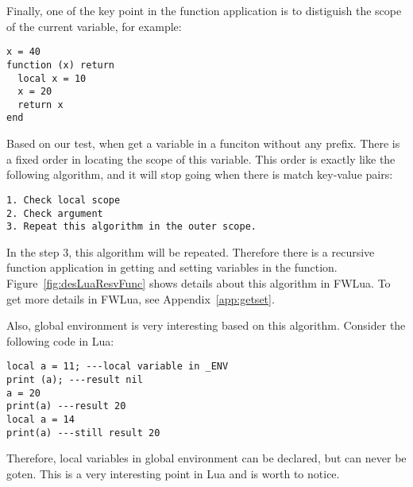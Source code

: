 Finally, one of the key point in the function application is to distiguish the scope of the current variable, for example:

\begin{verbatim}
x = 40
function (x) return 
  local x = 10
  x = 20
  return x
end
\end{verbatim}

Based on our test, when get a variable in a funciton without any prefix. There is a fixed order in locating the scope of this variable. This order is exactly like the following algorithm, and it will stop going when there is match key-value pairs:

\begin{verbatim}
1. Check local scope
2. Check argument
3. Repeat this algorithm in the outer scope.
\end{verbatim}

In the step 3, this algorithm will be repeated. Therefore there is a recursive function application in getting and setting variables in the function. Figure~\ref{fig:desLuaResvFunc} shows details about this algorithm in FWLua. To get more details in FWLua, see Appendix~\ref{app:getset}.

Also, global environment is very interesting based on this algorithm. Consider the following code in Lua:

\begin{verbatim}
local a = 11; ---local variable in _ENV
print (a); ---result nil
a = 20 
print(a) ---result 20
local a = 14
print(a) ---still result 20
\end{verbatim}

Therefore, local variables in global environment can be declared, but can never be goten. This is a very interesting point in Lua and is worth to notice.

